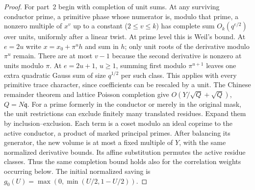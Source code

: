 \documentclass[11pt,letterpaper]{article}
\theoremstyle{definition}
\numberwithin{equation}{section}
\begin{document}
\begin{proof}
For part~2 begin with completion of unit sums. At any surviving
conductor prime, a primitive phase whose numerator is, modulo that
prime, a nonzero multiple of $x^v$ up to a constant ($2\le v\le k$)
has complete sum $O_k(q^{e/2})$ over units, uniformly after a linear
twist. At prime level this is Weil's bound. At $e=2u$ write
$x=x_0+\pi^u h$ and sum in $h$; only unit roots of the derivative
modulo $\pi^u$ remain. There are at most $v-1$ because the second
derivative is nonzero at units modulo $\pi$. At $e=2u+1$, $u\ge1$,
summing first modulo $\pi^{u+1}$ leaves one extra quadratic Gauss
sum of size $q^{1/2}$ per such class. This applies with every
primitive trace character, since coefficients can be rescaled by a
unit. The Chinese remainder theorem and lattice Poisson completion
give $O(Y/\sqrt Q+\sqrt Q)$, $Q=N\mathfrak q$. For a prime formerly
in the conductor or merely in the original mask, the unit restrictions
can exclude finitely many translated residues. Expand them by
inclusion--exclusion. Each term is a coset modulo an ideal
coprime to the active conductor, a product of marked principal primes.
After balancing its generator, the new volume is at most a fixed
multiple of $Y$, with the same normalized derivative bounds. Its
affine substitution permutes the active residue classes. Thus the
same completion bound holds also for the correlation weights
occurring below. The initial normalized saving is
$g_0(U)=\max(0,\min(U/2,1-U/2))$.


\end{proof}
\end{document}
